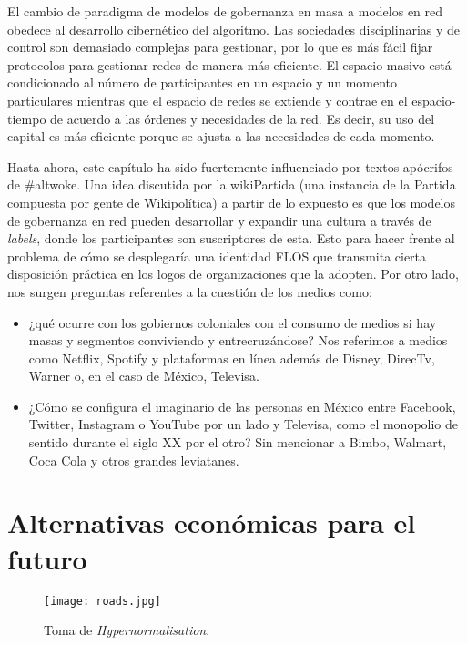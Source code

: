 El cambio de paradigma de modelos de gobernanza en masa a modelos en red obedece al desarrollo cibernético del algoritmo. Las sociedades disciplinarias y de control son demasiado complejas para gestionar, por lo que es más fácil fijar protocolos para gestionar redes de manera más eficiente. El espacio masivo está condicionado al número de participantes en un espacio y un momento particulares mientras que el espacio de redes se extiende y contrae en el espacio-tiempo de acuerdo a las órdenes y necesidades de la red. Es decir, su uso del capital es más eficiente porque se ajusta a las necesidades de cada momento.

Hasta ahora, este capítulo ha sido fuertemente influenciado por textos apócrifos de \#altwoke. Una idea discutida por la wikiPartida (una instancia de la Partida compuesta por gente de Wikipolítica) a partir de lo expuesto es que los modelos de gobernanza en red pueden desarrollar y expandir una cultura a través de \emph{labels}, donde los participantes son suscriptores de esta. Esto para hacer frente al problema de cómo se desplegaría una identidad FLOS que transmita cierta disposición práctica en los logos de organizaciones que la adopten. Por otro lado, nos surgen preguntas referentes a la cuestión de los medios como:

\begin{itemize}
	\item ¿qué ocurre con los gobiernos coloniales con el consumo de medios si hay masas y segmentos conviviendo y entrecruzándose? Nos referimos a medios como Netflix, Spotify y plataformas en línea además de Disney, DirecTv, Warner o, en el caso de México, Televisa.
	\item ¿Cómo se configura el imaginario de las personas en México entre Facebook, Twitter, Instagram o YouTube por un lado y Televisa, como el monopolio de sentido durante el siglo XX por el otro? Sin mencionar a Bimbo, Walmart, Coca Cola y otros grandes leviatanes. 
\end{itemize}

\section{Alternativas económicas para el futuro}
\label{sec:altfutur}

\begin{figure}[htbp]
	\centering
	\texttt{[image: roads.jpg]}
	\caption[\emph{Hypernormalisation}]{Toma de \emph{Hypernormalisation}.}
	\label{fig:hypernormalisation2}
\end{figure}

